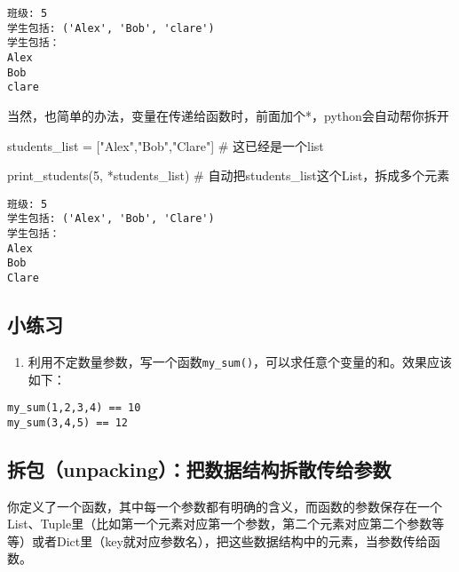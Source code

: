 \documentclass[
  letterpaper,
  DIV=11,
  numbers=noendperiod]{scrreprt}
\newenvironment{Shaded}{\begin{snugshade}}{\end{snugshade}}
\newcommand{\CommentTok}[1]{\textcolor[rgb]{0.37,0.37,0.37}{#1}}
\newcommand{\DecValTok}[1]{\textcolor[rgb]{0.68,0.00,0.00}{#1}}
\newcommand{\NormalTok}[1]{\textcolor[rgb]{0.00,0.23,0.31}{#1}}
\newcommand{\OperatorTok}[1]{\textcolor[rgb]{0.37,0.37,0.37}{#1}}
\newcommand{\StringTok}[1]{\textcolor[rgb]{0.13,0.47,0.30}{#1}}
\providecommand{\tightlist}{%
  \setlength{\itemsep}{0pt}\setlength{\parskip}{0pt}}\usepackage{longtable,booktabs,array}
\begin{document}
\begin{verbatim}
班级: 5
学生包括: ('Alex', 'Bob', 'clare')
学生包括：
Alex
Bob
clare
\end{verbatim}

当然，也简单的办法，变量在传递给函数时，前面加个*，python会自动帮你拆开

\begin{Shaded}
\begin{Highlighting}[]
\NormalTok{students\_list  }\OperatorTok{=}\NormalTok{ [}\StringTok{"Alex"}\NormalTok{,}\StringTok{"Bob"}\NormalTok{,}\StringTok{"Clare"}\NormalTok{] }\CommentTok{\# 这已经是一个list}

\NormalTok{print\_students(}\DecValTok{5}\NormalTok{, }\OperatorTok{*}\NormalTok{students\_list) }\CommentTok{\# 自动把students\_list这个List，拆成多个元素}
\end{Highlighting}
\end{Shaded}

\begin{verbatim}
班级: 5
学生包括: ('Alex', 'Bob', 'Clare')
学生包括：
Alex
Bob
Clare
\end{verbatim}

\hypertarget{ux5c0fux7ec3ux4e60-3}{%
\subsection{小练习}\label{ux5c0fux7ec3ux4e60-3}}

\begin{enumerate}
\def\labelenumi{\arabic{enumi}.}
\tightlist
\item
  利用不定数量参数，写一个函数\texttt{my\_sum()}，可以求任意个变量的和。效果应该如下：
\end{enumerate}

\begin{verbatim}
my_sum(1,2,3,4) == 10
my_sum(3,4,5) == 12
\end{verbatim}

\hypertarget{ux62c6ux5305unpackingux628aux6570ux636eux7ed3ux6784ux62c6ux6563ux4f20ux7ed9ux53c2ux6570}{%
\subsection{拆包（unpacking）：把数据结构拆散传给参数}\label{ux62c6ux5305unpackingux628aux6570ux636eux7ed3ux6784ux62c6ux6563ux4f20ux7ed9ux53c2ux6570}}

你定义了一个函数，其中每一个参数都有明确的含义，而函数的参数保存在一个List、Tuple里（比如第一个元素对应第一个参数，第二个元素对应第二个参数等等）或者Dict里（key就对应参数名），把这些数据结构中的元素，当参数传给函数。
\end{document}

